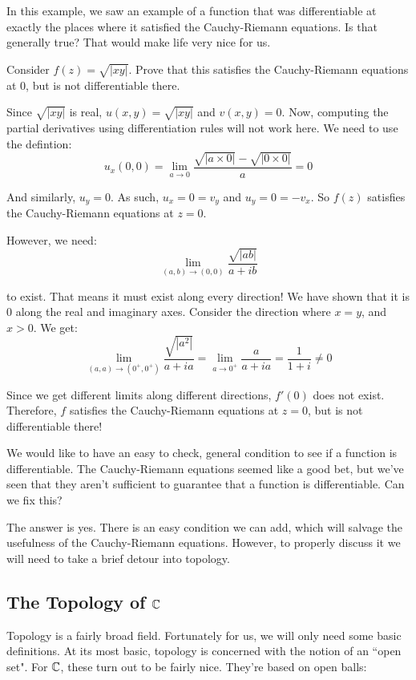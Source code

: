 In this example, we saw an example of a function that was differentiable at exactly the places where it satisfied the Cauchy-Riemann equations. Is that generally true? That would make life very nice for us.

\begin{ex}{}{}Consider $f(z) = \sqrt{|xy|}$. Prove that this satisfies the Cauchy-Riemann equations at $0$, but is not differentiable there.

Since $\sqrt{|xy|}$ is real, $u(x,y) = \sqrt{|xy|}$ and $v(x,y) = 0$. Now, computing the partial derivatives using differentiation rules will not work here. We need to use the defintion:
$$u_x(0,0) = \lim_{a\rightarrow 0} \frac{\sqrt{|a\times0|} - \sqrt{|0\times 0|}}{a} = 0$$

And similarly, $u_y = 0$. As such, $u_x = 0 = v_y$ and $u_y = 0 = -v_x$. So $f(z)$ satisfies the Cauchy-Riemann equations at $z = 0$.

However, we need:
$$\lim_{(a,b)\rightarrow (0,0)} \frac{\sqrt{|ab|}}{a + ib}$$

\noin to exist. That means it must exist along every direction! We have shown that it is $0$ along the real and imaginary axes. Consider the direction where $x = y$, and $x > 0$. We get:
$$\lim_{(a,a) \rightarrow (0^+,0^+)} \frac{\sqrt{|a^2|}}{a+ia} = \lim_{a\rightarrow 0^+}\frac{a}{a+ia} = \frac{1}{1+i} \ne 0$$ 

Since we get different limits along different directions, $f'(0)$ does not exist. Therefore, $f$ satisfies the Cauchy-Riemann equations at $z = 0$, but is not differentiable there!
\end{ex}

We would like to have an easy to check, general condition to see if a function is differentiable. The Cauchy-Riemann equations seemed like a good bet, but we've seen that they aren't sufficient to guarantee that a function is differentiable. Can we fix this?

The answer is yes. There is an easy condition we can add, which will salvage the usefulness of the Cauchy-Riemann equations. However, to properly discuss it we will need to take a brief detour into topology.

\subsection{The Topology of $\mathbb{C}$}

Topology is a fairly broad field. Fortunately for us, we will only need some basic definitions. At its most basic, topology is concerned with the notion of an ``open set". For $\mathbb{C}$, these turn out to be fairly nice. They're based on open balls:

